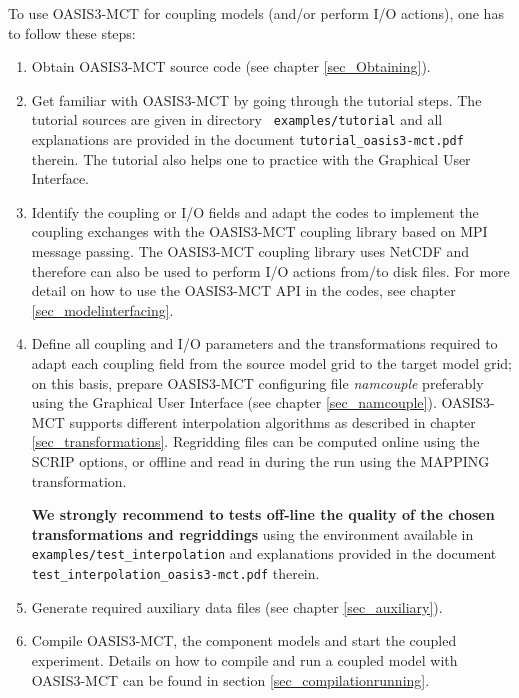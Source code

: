 To use OASIS3-MCT for coupling models (and/or perform I/O
actions), one has to follow these steps:
\begin{enumerate}
\item Obtain OASIS3-MCT source code (see chapter \ref{sec_Obtaining}).
\item Get familiar with OASIS3-MCT by going through the tutorial steps. The tutorial sources are given in directory {\tt
  examples/tutorial} and all explanations are provided in the document
{\tt tutorial\_oasis3-mct.pdf} therein. The tutorial also helps one to
practice with the Graphical User Interface.

\item Identify the coupling or I/O fields and adapt the codes to
  implement the coupling exchanges with the OASIS3-MCT coupling library based on MPI message passing.
  The OASIS3-MCT coupling library uses NetCDF and therefore can also be used to perform I/O actions
  from/to disk files.  For more detail on how to use the 
  OASIS3-MCT API in the codes, see chapter \ref{sec_modelinterfacing}.

\item Define all coupling and I/O parameters and the transformations
  required to adapt each coupling field from the source model grid to
  the target model grid; on this basis, prepare OASIS3-MCT configuring file 
  {\it namcouple} preferably using the
  Graphical User Interface  (see chapter \ref{sec_namcouple}). 
  OASIS3-MCT supports different interpolation algorithms as described in
  chapter \ref{sec_transformations}.  Regridding files can be computed
  online using the SCRIP options, or offline and read in during the run using the MAPPING
  transformation.

{\bf We strongly recommend to tests off-line the quality of the chosen transformations and regriddings} using the environment available in {\tt
  examples/test\_interpolation} and explanations provided in the document {\tt test\_interpolation\_oasis3-mct.pdf} therein. 

\item Generate required auxiliary data files (see chapter
  \ref{sec_auxiliary}).
\item Compile OASIS3-MCT, the component models and start the coupled
  experiment. Details on how to compile and run a coupled model with OASIS3-MCT can be found in section \ref{sec_compilationrunning}. 

\end{enumerate}

